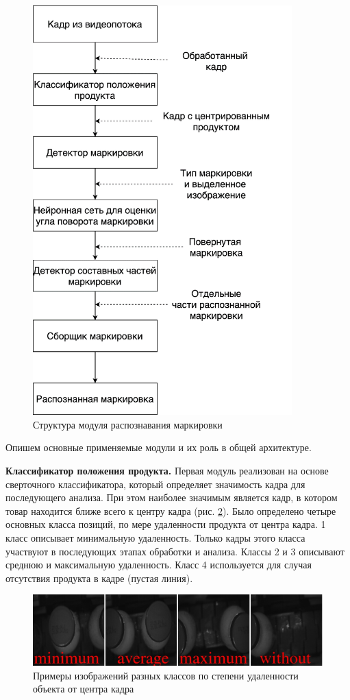 \begin{figure}[ht]
	\centering
	\includegraphics[width=10cm]{man-source/images/ch4/pic4-13.png}
	\caption{Структура модуля распознавания маркировки}
	\label{fig:structure}
\end{figure}

Опишем основные применяемые модули и их роль в общей архитектуре.

\textbf{Классификатор положения продукта.} Первая модуль реализован на основе сверточного классификатора, который определяет значимость кадра для последующего анализа. При этом наиболее значимым является кадр, в котором товар находится ближе всего к центру кадра (рис. \ref{fig:distance_classes}). Было определено четыре основных класса позиций, по мере удаленности продукта от центра кадра. 1 класс описывает минимальную удаленность. Только кадры этого класса участвуют в последующих этапах обработки и анализа. Классы 2 и 3 описывают среднюю и максимальную удаленность. Класс 4 используется для случая отсутствия продукта в кадре (пустая линия).

\begin{figure}[ht]
	\centering
	\includegraphics[width=16cm]{man-source/images/ch4/pic4-24.jpeg}
	\caption{Примеры изображений разных классов по степени удаленности объекта от центра кадра}
	\label{fig:distance_classes}
\end{figure}

